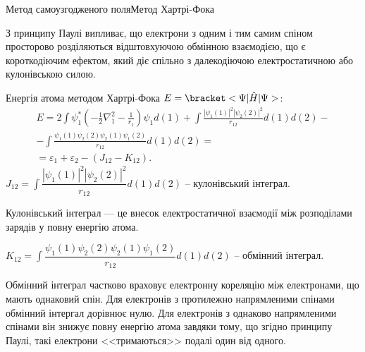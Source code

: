 \documentclass[10pt]{beamer}
\begin{document}
\begin{frame}{Метод самоузгодженого поля}{Метод Хартрі-Фока}
\begin{overprint}
        \begin{block}{}\justifying
            З принципу Паулі випливає, що \alert{електрони з одним і тим самим спіном просторово
            розділяються відштовхуючою обмінною взаємодією}, що є короткодіючим ефектом, який діє
            спільно з далекодіючою електростатичною або кулонівською силою.
        \end{block}
		Енергія атома методом Хартрі-Фока $E = \bracket<{\Psi}|{\hat{H}}|{\Psi}>$:
		\begin{multline*}
			E = 2 \int \psi^*_1 \left( -\frac12 \nabla_1^2 - \frac{1}{r_{1}}\right) \psi_1 d(1) +  \int\frac{|\psi_1(1)|^2 |\psi_2(2)|^2}{r_{12}} d(1) d(2) - \\
			- \int\frac{\psi_1 (1) \psi_2(2) \psi_2 (1) \psi_1(2)}{r_{12}} d(1) d(2)
			= \\
			= \varepsilon_1 + \varepsilon_2 - \left(J_{12} - K_{12}\right) .
		\end{multline*}
		\onslide<5>
		\(%
		J_{12} = \int\dfrac{|\psi_1(1)|^2 |\psi_2(2)|^2}{r_{12}} d(1) d(2)%
		\) -- кулонівський інтеграл.

		\begin{block}{}\scriptsize\justifying
			Кулонівський інтеграл --- це внесок електростатичної взаємодії між розподілами зарядів у повну енергію атома.
		\end{block}

		\(%
		K_{12} = \int\dfrac{\psi_1 (1) \psi_2(2) \psi_2 (1) \psi_1(2)}{r_{12}} d(1) d(2)%
		\) -- обмінний інтеграл.

		\begin{block}{}\scriptsize\justifying
			Обмінний інтеграл частково \alert{враховує електронну кореляцію між електронами, що мають однаковий спін}. Для електронів з протилежно напрямленими спінами обмінний інтергал дорівнює нулю. Для електронів з однаково напрямленими спінами він знижує повну енергію атома завдяки тому, що згідно принципу Паулі, такі електрони <<тримаються>> подалі один від одного.
		\end{block}
	\end{overprint}
\end{frame}
\end{document}

